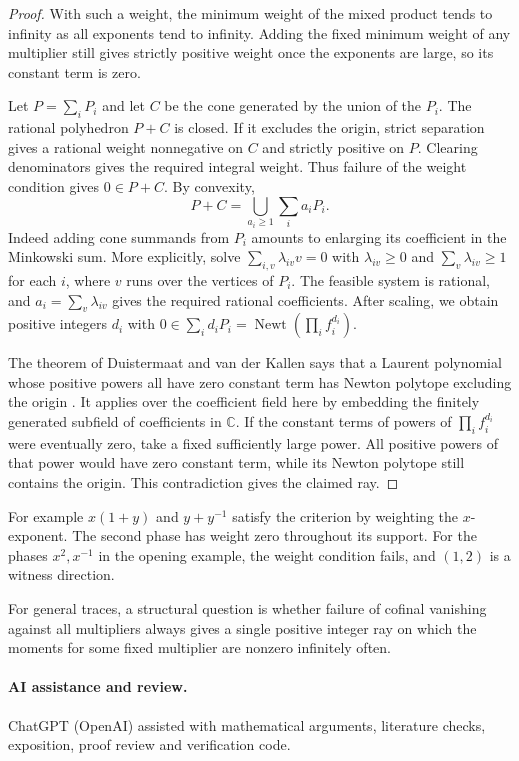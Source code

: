 \documentclass[11pt]{article}
\DeclareMathOperator{\Newt}{Newt}
\begin{document}
\begin{proof}
With such a weight, the minimum weight of the mixed product
tends to infinity as all exponents tend to infinity. Adding
the fixed minimum weight of any multiplier still gives strictly
positive weight once the exponents are large, so its constant
term is zero.

Let \(P=\sum_i P_i\) and let \(C\) be the cone generated by the union
of the \(P_i\). The rational polyhedron \(P+C\) is closed. If it
excludes the origin, strict separation gives a rational weight
nonnegative on \(C\) and strictly positive on \(P\). Clearing
denominators gives the required integral weight. Thus failure
of the weight condition gives \(0\in P+C\). By convexity,
\[
                P+C=\bigcup_{a_i\ge1}\sum_i a_i P_i .
\]
Indeed adding cone summands from \(P_i\) amounts to enlarging its
coefficient in the Minkowski sum. More explicitly, solve
\(\sum_{i,v}\lambda_{iv}v=0\) with \(\lambda_{iv}\ge0\) and
\(\sum_v\lambda_{iv}\ge1\) for each \(i\), where \(v\) runs over
the vertices of \(P_i\). The feasible system is rational, and
\(a_i=\sum_v\lambda_{iv}\) gives the required rational coefficients.
After scaling, we obtain positive integers \(d_i\) with
\(0\in\sum_i d_iP_i=\Newt(\prod_i f_i^{d_i})\).

The theorem of Duistermaat and van der Kallen says that a Laurent
polynomial whose positive powers all have zero constant term has
Newton polytope excluding the origin \cite[\S3]{DvK}.
It applies over the coefficient field here by embedding the
finitely generated subfield of coefficients in \(\mathbb C\).
If the constant terms of powers of \(\prod_i f_i^{d_i}\) were
eventually zero, take a fixed sufficiently large power.
All positive powers of that power would have zero constant term,
while its Newton polytope still contains the origin.
This contradiction gives the claimed ray.
\end{proof}

For example \(x(1+y)\) and \(y+y^{-1}\) satisfy the criterion
by weighting the \(x\)-exponent. The second phase has weight zero
throughout its support. For the phases \(x^2,x^{-1}\) in the
opening example, the weight condition fails, and \((1,2)\)
is a witness direction.

For general traces, a structural question is whether failure of
cofinal vanishing against all multipliers always gives a single
positive integer ray on which the moments for some fixed multiplier
are nonzero infinitely often.

\paragraph{AI assistance and review.}
ChatGPT (OpenAI) assisted with mathematical arguments, literature
checks, exposition, proof review and verification code.
\end{document}
